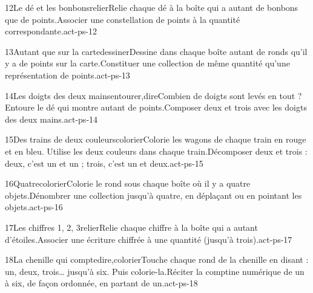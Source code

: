 \begin{activite}{12}{Le dé et les bonbons}{relier}{Relie chaque dé à la boîte qui a {\otBold\color{otNavy}autant} de bonbons que de points.}{Associer une constellation de points à la quantité correspondante.}{act-ps-12}
\end{activite}
\begin{activite}{13}{Autant que sur la carte}{dessiner}{Dessine dans chaque boîte {\otBold\color{otNavy}autant} de ronds qu’il y a de points sur la carte.}{Constituer une collection de même quantité qu’une représentation de points.}{act-ps-13}
\end{activite}
\begin{activite}{14}{Les doigts des deux mains}{entourer,dire}{Combien de doigts sont levés en tout ? Entoure le dé qui montre {\otBold\color{otNavy}autant} de points.}{Composer deux et trois avec les doigts des deux mains.}{act-ps-14}
\end{activite}
\begin{activite}{15}{Des trains de deux couleurs}{colorier}{Colorie les wagons de chaque train en rouge et en bleu. Utilise les deux couleurs dans chaque train.}{Décomposer deux et trois : deux, c’est un et un ; trois, c’est un et deux.}{act-ps-15}
\end{activite}
\begin{activite}{16}{Quatre}{colorier}{Colorie le rond sous chaque boîte où il y a {\otBold\color{otNavy}quatre} objets.}{Dénombrer une collection jusqu’à quatre, en déplaçant ou en pointant les objets.}{act-ps-16}
\end{activite}
\begin{activite}{17}{Les chiffres 1, 2, 3}{relier}{Relie chaque chiffre à la boîte qui a {\otBold\color{otNavy}autant} d’étoiles.}{Associer une écriture chiffrée à une quantité (jusqu’à trois).}{act-ps-17}
\end{activite}
\begin{activite}{18}{La chenille qui compte}{dire,colorier}{Touche chaque rond de la chenille en disant : un, deux, trois… jusqu’à six. Puis colorie-la.}{Réciter la comptine numérique de un à six, de façon ordonnée, en partant de un.}{act-ps-18}
\end{activite}
